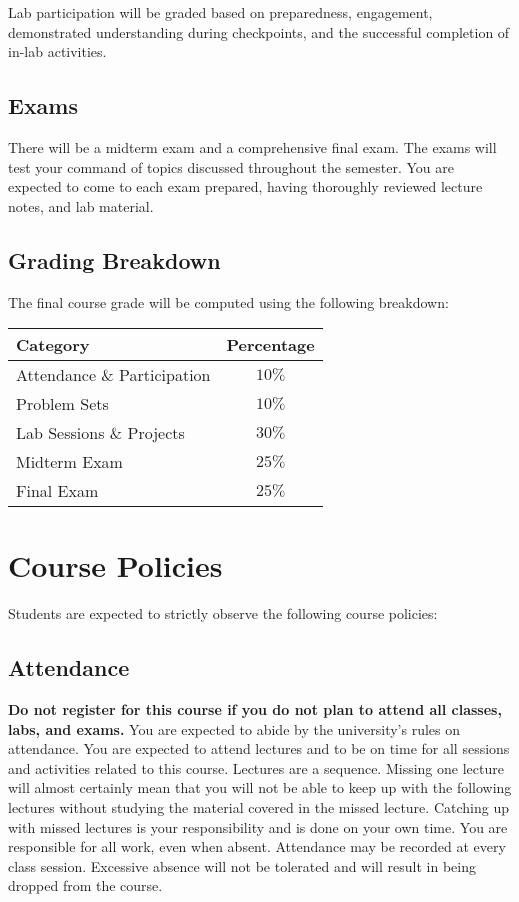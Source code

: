 \documentclass[10pt,a4paper,american]{article}
\begin{document}
Lab participation will be graded based on preparedness, engagement, demonstrated understanding during checkpoints, and the successful completion of in-lab activities.

\subsection{Exams}
There will be a midterm exam and a comprehensive final exam. The exams will test your command of topics discussed throughout the semester. You are expected to come to each exam prepared, having thoroughly reviewed lecture notes, and lab material.

\subsection{Grading Breakdown}
The final course grade will be computed using the following breakdown:

\begin{center}
	\renewcommand{\arraystretch}{2}
	\begin{tabular}{|p{2.5in}|c|}
		\hline
		\textbf{Category} & \textbf{Percentage} \\
		\hline
		Attendance \& Participation               & $10\%$              \\
		\hline
		Problem Sets                              & $10\%$              \\
		\hline
		Lab Sessions \& Projects                  & $30\%$              \\
		\hline
		Midterm Exam                              & $25\%$              \\
		\hline
		Final Exam                                & $25\%$              \\
		\hline
	\end{tabular}
\end{center}

\section{Course Policies}
Students are expected to strictly observe the following course policies:

\subsection{Attendance}
\textbf{Do not register for this course if you do not plan to attend all classes, labs, and exams.} You are expected to abide by the university's rules on attendance. You are expected to attend lectures and to be on time for all sessions and activities related to this course. Lectures are a sequence. Missing one lecture will almost certainly mean that you will not be able to keep up with the following lectures without studying the material covered in the missed lecture. Catching up with missed lectures is your responsibility and is done on your own time. You are responsible for all work, even when absent. Attendance may be recorded at every class session. Excessive absence will not be tolerated and will result in being dropped from the course.
\end{document}
